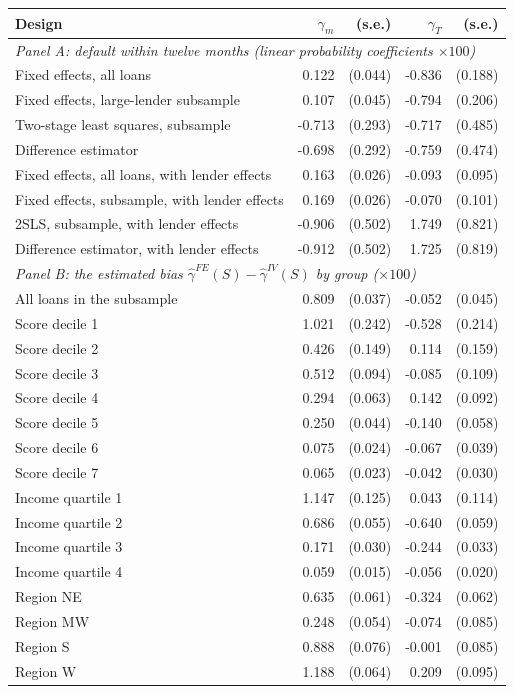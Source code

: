 \begin{tabular}{lrrrr}
\toprule
Design & $\gamma_m$ & (s.e.) & $\gamma_T$ & (s.e.) \\
\midrule
\multicolumn{5}{l}{\emph{Panel A: default within twelve months (linear probability coefficients $\times 100$)}} \\
Fixed effects, all loans & 0.122 & (0.044) & -0.836 & (0.188) \\
Fixed effects, large-lender subsample & 0.107 & (0.045) & -0.794 & (0.206) \\
Two-stage least squares, subsample & -0.713 & (0.293) & -0.717 & (0.485) \\
Difference estimator & -0.698 & (0.292) & -0.759 & (0.474) \\
Fixed effects, all loans, with lender effects & 0.163 & (0.026) & -0.093 & (0.095) \\
Fixed effects, subsample, with lender effects & 0.169 & (0.026) & -0.070 & (0.101) \\
2SLS, subsample, with lender effects & -0.906 & (0.502) & 1.749 & (0.821) \\
Difference estimator, with lender effects & -0.912 & (0.502) & 1.725 & (0.819) \\
\midrule
\multicolumn{5}{l}{\emph{Panel B: the estimated bias $\hat\gamma^{FE}(S) - \hat\gamma^{IV}(S)$ by group ($\times 100$)}} \\
All loans in the subsample & 0.809 & (0.037) & -0.052 & (0.045) \\
Score decile 1 & 1.021 & (0.242) & -0.528 & (0.214) \\
Score decile 2 & 0.426 & (0.149) & 0.114 & (0.159) \\
Score decile 3 & 0.512 & (0.094) & -0.085 & (0.109) \\
Score decile 4 & 0.294 & (0.063) & 0.142 & (0.092) \\
Score decile 5 & 0.250 & (0.044) & -0.140 & (0.058) \\
Score decile 6 & 0.075 & (0.024) & -0.067 & (0.039) \\
Score decile 7 & 0.065 & (0.023) & -0.042 & (0.030) \\
Income quartile 1 & 1.147 & (0.125) & 0.043 & (0.114) \\
Income quartile 2 & 0.686 & (0.055) & -0.640 & (0.059) \\
Income quartile 3 & 0.171 & (0.030) & -0.244 & (0.033) \\
Income quartile 4 & 0.059 & (0.015) & -0.056 & (0.020) \\
Region NE & 0.635 & (0.061) & -0.324 & (0.062) \\
Region MW & 0.248 & (0.054) & -0.074 & (0.085) \\
Region S & 0.888 & (0.076) & -0.001 & (0.085) \\
Region W & 1.188 & (0.064) & 0.209 & (0.095) \\
\bottomrule
\end{tabular}
